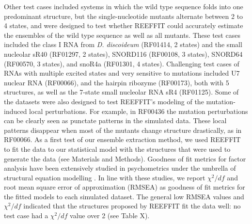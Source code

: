 \documentclass[12pt]{article}
\begin{document}
Other test cases included systems in which the wild type sequence folds into one predominant structure, but the single-nucleotide mutants alternate between 2 to 4 states, and were designed to test whether REEFFIT could accurately estimate the ensembles of the wild type sequence as well as all mutants.
These test cases included the class I RNA from \textit{D. discoideum} (RF01414, 2 states) and the small nucleolar sR40 (RF01297, 2 states), SNORD116 (RF00108, 3 states), SNORD64 (RF00570, 3 states), and snoR4a (RF01301, 4 states).
Challenging test cases of RNAs with multiple excited states and very sensitive to mutations included U7 nuclear RNA (RF00066), and the hairpin ribozyme (RF00173), both with 5 structures, as well as the 7-state small nucleolar RNA sR4 (RF01125).
Some of the datasets were also designed to test REEFFIT's modeling of the mutation-induced local perturbations. 
For example, in RF00436 the mutation perturbations can be clearly seen as punctate patterns in the simulated data.
These local patterns disappear when most of the mutants change structure drastically, as in RF00066.
As a first test of our ensemble extraction method, we used REEFFIT to fit the data to our statistical model with the structures that were used to generate the data (see Materials and Methods). 
Goodness of fit metrics for factor analysis have been extensively studied in psychometrics under the umbrella of structural equation modelling \cite{Schreiber2006,Marsh1988,Babyak2010}. 
In line with these studies, we report $\chi^2/df$ and root mean square error of approximation (RMSEA) as goodness of fit metrics for the fitted models to each simulated dataset. 
The general low RMSEA values and $\chi^2/df$ indicated that the structures proposed by REEFFIT fit the data well: no test case had a $\chi^2/df$ value over 2 (see Table X).
\end{document}
